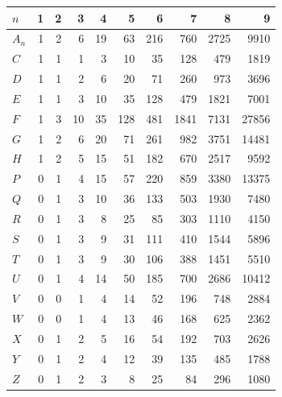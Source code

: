 \begin{tabular}{@{}lrrrrrrrrr@{}}
\toprule
$n$ & 1 & 2 & 3 & 4 & 5 & 6 & 7 & 8 & 9\\
\midrule
$A_n$ & 1 & 2 & 6 & 19 & 63 & 216 & 760 & 2725 & 9910\\
\midrule
$C$ & 1 & 1 & 1 & 3 & 10 & 35 & 128 & 479 & 1819\\
$D$ & 1 & 1 & 2 & 6 & 20 & 71 & 260 & 973 & 3696\\
$E$ & 1 & 1 & 3 & 10 & 35 & 128 & 479 & 1821 & 7001\\
$F$ & 1 & 3 & 10 & 35 & 128 & 481 & 1841 & 7131 & 27856\\
$G$ & 1 & 2 & 6 & 20 & 71 & 261 & 982 & 3751 & 14481\\
$H$ & 1 & 2 & 5 & 15 & 51 & 182 & 670 & 2517 & 9592\\
$P$ & 0 & 1 & 4 & 15 & 57 & 220 & 859 & 3380 & 13375\\
$Q$ & 0 & 1 & 3 & 10 & 36 & 133 & 503 & 1930 & 7480\\
$R$ & 0 & 1 & 3 & 8 & 25 & 85 & 303 & 1110 & 4150\\
$S$ & 0 & 1 & 3 & 9 & 31 & 111 & 410 & 1544 & 5896\\
$T$ & 0 & 1 & 3 & 9 & 30 & 106 & 388 & 1451 & 5510\\
$U$ & 0 & 1 & 4 & 14 & 50 & 185 & 700 & 2686 & 10412\\
$V$ & 0 & 0 & 1 & 4 & 14 & 52 & 196 & 748 & 2884\\
$W$ & 0 & 0 & 1 & 4 & 13 & 46 & 168 & 625 & 2362\\
$X$ & 0 & 1 & 2 & 5 & 16 & 54 & 192 & 703 & 2626\\
$Y$ & 0 & 1 & 2 & 4 & 12 & 39 & 135 & 485 & 1788\\
$Z$ & 0 & 1 & 2 & 3 & 8 & 25 & 84 & 296 & 1080\\
\bottomrule
\end{tabular}
